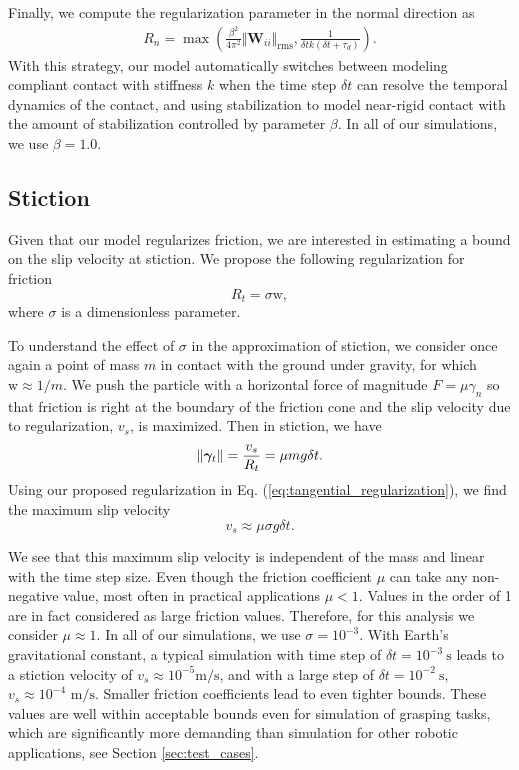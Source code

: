 Finally, we compute the regularization parameter in the normal direction as
\begin{eqnarray}
    R_n = \max\left(\frac{\beta^2}{4\pi^2}\Vert\mathbf{W}_{ii}\Vert_\text{rms}, 
    \frac{1}{\delta t k(\delta t+\tau_d)}\right)
    \label{eq:normal_regularization}.
\end{eqnarray}
With this strategy, our model automatically switches between modeling compliant
contact with stiffness $k$ when the time step $\delta t$ can resolve the
temporal dynamics of the contact, and using stabilization to model near-rigid
contact with the amount of stabilization controlled by parameter
$\beta$. In all of our simulations, we use $\beta=1.0$.

\subsection{Stiction}
\label{sec:stiction_parameterization}

Given that our model regularizes friction, we are interested in estimating a bound on
the slip velocity at stiction. We propose the following regularization for friction
\begin{equation}
    R_t = \sigma \text{w},
    \label{eq:tangential_regularization}
\end{equation}
where $\sigma$ is a dimensionless parameter.

To understand the effect of $\sigma$ in the approximation of stiction, we
consider once again a point of mass $m$ in contact with the ground under gravity,
for which $\text{w}\approx 1/m$. We push the particle with a horizontal force of magnitude
$F=\mu\gamma_n$ so that friction is right at the boundary of the friction cone and
the slip velocity due to regularization, $v_s$, is maximized. Then in stiction, we have
\begin{equation*}
    \|{\bm\gamma}_t\| = \frac{v_s}{R_t} = \mu m g \delta t.
\end{equation*}
Using our proposed regularization in Eq. (\ref{eq:tangential_regularization}), we find
the maximum slip velocity
\begin{equation}
    v_s \approx \mu\sigma g \delta t.
    \label{eq:slip_estimation}
\end{equation}

We see that this maximum slip velocity is independent of the mass and linear
with the time step size. Even though the friction coefficient $\mu$ can take any
non-negative value, most often in practical applications $\mu < 1$. Values in the
order of 1 are in fact considered as large friction values. Therefore, for this
analysis we consider $\mu\approx 1$.
In all of our simulations, we use $\sigma=10^{-3}$. With
Earth's gravitational constant, a typical simulation with time step of $\delta
t=10^{-3}~\text{s}$ leads to a stiction velocity of $v_s\approx
10^{-5}\text{m}/\text{s}$, and with a large step of $\delta t=10^{-2}~\text{s}$,
$v_s\approx 10^{-4}\text{ m}/\text{s}$. Smaller friction coefficients lead to
even tighter bounds. These values are well within acceptable bounds even for
simulation of grasping tasks, which are significantly more demanding than
simulation for other robotic applications, see Section \ref{sec:test_cases}.

